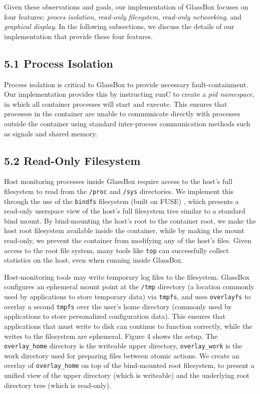 \documentclass{proc}
\begin{document}
Given these observations and goals, our implementation of GlassBox focuses on four features: \textit{proces isolation}, \textit{read-only filesystem}, \textit{read-only networking}, and \textit{graphical display}. In the following subsections, we discuss the details of our implementation that provide these four features.

\subsection*{5.1 Process Isolation}

Process isolation is critical to GlassBox to provide necessary fault-containment. Our implementation provides this by instructing runC to create a \textit{pid namespace}, in which all container processes will start and execute. This ensures that processes in the container are unable to communicate directly with processes outside the container using standard inter-process communication methods such as signals and shared memory.

\subsection*{5.2 Read-Only Filesystem}

Host monitoring processes inside GlassBox require access to the host's full filesystem to read from the \texttt{/proc} and \texttt{/sys} directories. We implement this through the use of the \texttt{bindfs} filesystem (built on FUSE) \cite{bindfs}, which presents a read-only userspace view of the host's full filesystem tree similar to a standard bind mount. By bind-mounting the host's root to the container root, we make the host root filesystem available inside the container, while by making the mount read-only, we prevent the container from modifying any of the host's files. Given access to the root file system, many tools like \texttt{top} can successfully collect statistics on the host, even when running inside GlassBox.

Host-monitoring tools may write temporary log files to the filesystem. GlassBox configures an ephemeral mount point at the \texttt{/tmp} directory (a location commonly used by applications to store temporary data) via \texttt{tmpfs}, and uses \texttt{overlayfs} to overlay a second \texttt{tmpfs} over the user's home directory (commonly used by applications to store personalized configuration data). This ensures that applications that must write to disk can continue to function correctly, while the writes to the filesystem are ephemeral. Figure 4 shows the setup. The \texttt{overlay\_home} directory is the writeable upper directory, \texttt{overlay\_work} is the work directory used for preparing files between atomic actions. We create an overlay of \texttt{overlay\_home} on top of the bind-mounted root filesystem, to present a unified view of the upper directory (which is writeable) and the underlying root directory tree (which is read-only).
\end{document}
